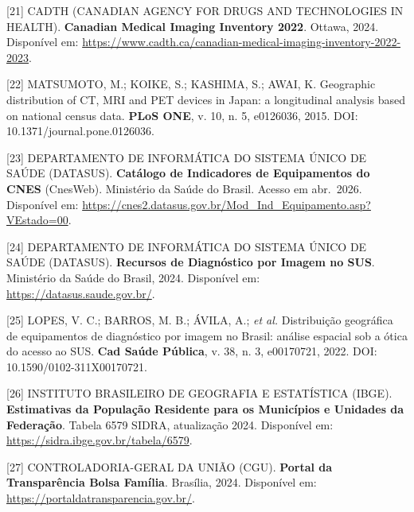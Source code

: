 \documentclass[12pt,a4paper,oneside]{article}
\begin{document}
\begin{singlespace}
\noindent\hangindent=1.25cm\label{ref:cmii}
[21] CADTH (CANADIAN AGENCY FOR DRUGS AND TECHNOLOGIES IN HEALTH).
\textbf{Canadian Medical Imaging Inventory 2022}.
Ottawa, 2024. Disponível em:
\url{https://www.cadth.ca/canadian-medical-imaging-inventory-2022-2023}.\par\smallskip

\noindent\hangindent=1.25cm\label{ref:japan-imaging}
[22] MATSUMOTO, M.; KOIKE, S.; KASHIMA, S.; AWAI, K. Geographic
distribution of CT, MRI and PET devices in Japan: a longitudinal
analysis based on national census data. \textbf{PLoS ONE}, v. 10,
n. 5, e0126036, 2015. DOI: 10.1371/journal.pone.0126036.\par\smallskip

\noindent\hangindent=1.25cm\label{ref:datasus-cat}
[23] DEPARTAMENTO DE INFORMÁTICA DO SISTEMA ÚNICO DE SAÚDE (DATASUS).
\textbf{Catálogo de Indicadores de Equipamentos do CNES} (CnesWeb).
Ministério da Saúde do Brasil. Acesso em abr.\ 2026. Disponível em:
\url{https://cnes2.datasus.gov.br/Mod_Ind_Equipamento.asp?VEstado=00}.
\par\smallskip

\noindent\hangindent=1.25cm\label{ref:datasus}
[24] DEPARTAMENTO DE INFORMÁTICA DO SISTEMA ÚNICO DE SAÚDE (DATASUS).
\textbf{Recursos de Diagnóstico por Imagem no SUS}. Ministério da
Saúde do Brasil, 2024. Disponível em:
\url{https://datasus.saude.gov.br/}.\par\smallskip

\noindent\hangindent=1.25cm\label{ref:lopes}
[25] LOPES, V. C.; BARROS, M. B.; ÁVILA, A.; \textit{et al.}
Distribuição geográfica de equipamentos de diagnóstico por imagem
no Brasil: análise espacial sob a ótica do acesso ao SUS.
\textbf{Cad Saúde Pública}, v. 38, n. 3, e00170721, 2022. DOI:
10.1590/0102-311X00170721.\par\smallskip

\noindent\hangindent=1.25cm\label{ref:ibge}
[26] INSTITUTO BRASILEIRO DE GEOGRAFIA E ESTATÍSTICA (IBGE).
\textbf{Estimativas da População Residente para os Municípios e
Unidades da Federação}. Tabela 6579 SIDRA, atualização 2024.
Disponível em: \url{https://sidra.ibge.gov.br/tabela/6579}.\par\smallskip

\noindent\hangindent=1.25cm\label{ref:cgu}
[27] CONTROLADORIA-GERAL DA UNIÃO (CGU). \textbf{Portal da
Transparência \textendash{} Bolsa Família}. Brasília, 2024.
Disponível em:
\url{https://portaldatransparencia.gov.br/}.\par\smallskip


\end{singlespace}
\end{document}
